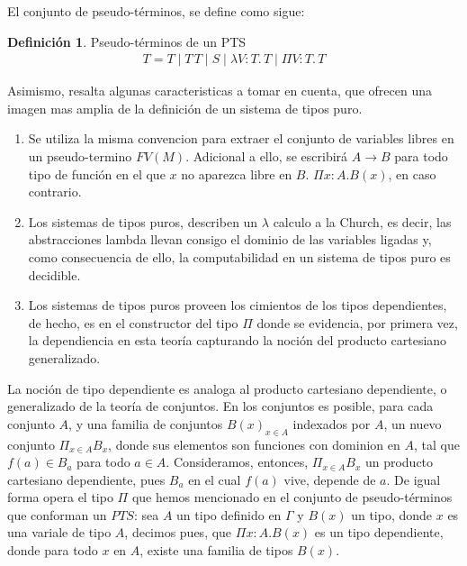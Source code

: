 \documentclass[a4paper,12pt]{report}
\theoremstyle{definition}
\newtheorem{definition}{Definici\'on}[chapter]
\theoremstyle{plain}
\theoremstyle{remark}
\begin{document}
    El conjunto de pseudo-términos, se define como sigue:
    \begin{definition} Pseudo-términos de un PTS
    \begin{align*}
      T = T \mid T\, T \mid S \mid \lambda V: T.\, T \mid \Pi V: T.\, T
    \end{align*}
    \end{definition}

    Asimismo, resalta \cite{barthe-coquand} algunas caracteristicas a tomar en cuenta, que ofrecen una imagen mas amplia de la definición de un sistema de tipos puro.

    \begin{enumerate}
            \item Se utiliza la misma convencion para extraer el conjunto de variables libres en un pseudo-termino $FV(M)$. Adicional a ello, se escribirá $A \to B$ para todo tipo de función en el que $x$ no aparezca libre en $B$. $\Pi x: A . B(x)$, en caso contrario.
            \item Los sistemas de tipos puros, describen un $\lambda$ calculo a la Church, es decir, las abstracciones lambda llevan consigo el dominio  de las variables ligadas y, como consecuencia de ello, la computabilidad en un sistema de tipos puro es decidible.
            \item Los sistemas de tipos puros proveen los cimientos de los tipos dependientes, de hecho, es en el constructor del tipo $\Pi$ donde se evidencia, por primera vez, la dependiencia en esta teoría capturando la noción del producto cartesiano generalizado.
    \end{enumerate}

    La noción de tipo dependiente es analoga al producto cartesiano dependiente, o generalizado de la teoría de conjuntos. En los conjuntos es posible, para cada conjunto $A$, y una familia de conjuntos $B(x)_{x\in A}$ indexados por $A$, un nuevo conjunto $\Pi _{x\in A} B_x$, donde sus elementos son funciones con dominion en $A$, tal que $f(a) \in B_a$ para todo $a \in A$. Consideramos, entonces, $\Pi _{x\in A} B_x$ un producto cartesiano dependiente, pues $B_a$ en el cual $f(a)$ vive, depende de $a$. De igual forma opera el tipo $\Pi$ que hemos mencionado en el conjunto de pseudo-términos que conforman un $PTS$: sea $A$ un tipo definido en $\Gamma$ y $B(x)$ un tipo, donde $x$ es una variale de tipo $A$, decimos pues, que $\Pi x : A . B(x)$ es un tipo dependiente, donde para todo $x$ en $A$, existe una familia de tipos $B(x)$.
\end{document}
